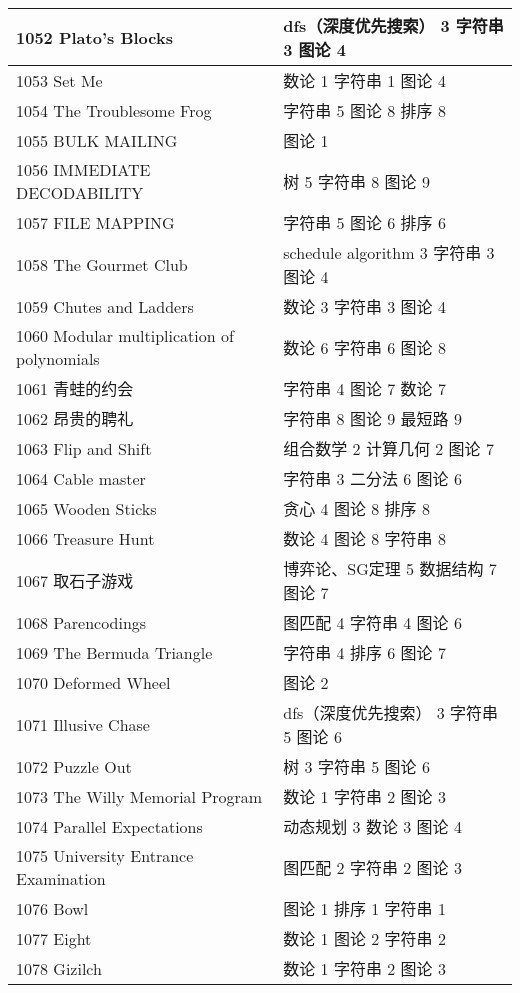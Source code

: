 \begin{longtable}{| p{} | p{} |}
 1052 Plato's Blocks  & dfs（深度优先搜索） 3 字符串 3 图论 4 \\ \hline
 1053 Set Me  & 数论 1 字符串 1 图论 4 \\ \hline
 1054 The Troublesome Frog  & 字符串 5 图论 8 排序 8 \\ \hline
 1055 BULK MAILING  & 图论 1 \\ \hline
 1056 IMMEDIATE DECODABILITY  & 树 5 字符串 8 图论 9 \\ \hline
 1057 FILE MAPPING  & 字符串 5 图论 6 排序 6 \\ \hline
 1058 The Gourmet Club  & schedule algorithm 3 字符串 3 图论 4 \\ \hline
 1059 Chutes and Ladders  & 数论 3 字符串 3 图论 4 \\ \hline
 1060 Modular multiplication of polynomials  & 数论 6 字符串 6 图论 8 \\ \hline
 1061 青蛙的约会  & 字符串 4 图论 7 数论 7 \\ \hline
 1062 昂贵的聘礼  & 字符串 8 图论 9 最短路 9 \\ \hline
 1063 Flip and Shift  & 组合数学 2 计算几何 2 图论 7 \\ \hline
 1064 Cable master  & 字符串 3 二分法 6 图论 6 \\ \hline
 1065 Wooden Sticks  & 贪心 4 图论 8 排序 8 \\ \hline
 1066 Treasure Hunt  & 数论 4 图论 8 字符串 8 \\ \hline
 1067 取石子游戏  & 博弈论、SG定理 5 数据结构 7 图论 7 \\ \hline
 1068 Parencodings  & 图匹配 4 字符串 4 图论 6 \\ \hline
 1069 The Bermuda Triangle  & 字符串 4 排序 6 图论 7 \\ \hline
 1070 Deformed Wheel  & 图论 2 \\ \hline
 1071 Illusive Chase  & dfs（深度优先搜索） 3 字符串 5 图论 6 \\ \hline
 1072 Puzzle Out  & 树 3 字符串 5 图论 6 \\ \hline
 1073 The Willy Memorial Program  & 数论 1 字符串 2 图论 3 \\ \hline
 1074 Parallel Expectations  & 动态规划 3 数论 3 图论 4 \\ \hline
 1075 University Entrance Examination  & 图匹配 2 字符串 2 图论 3 \\ \hline
 1076 Bowl  & 图论 1 排序 1 字符串 1 \\ \hline
 1077 Eight  & 数论 1 图论 2 字符串 2 \\ \hline
 1078 Gizilch  & 数论 1 字符串 2 图论 3 \\ \hline

\end{longtable}
